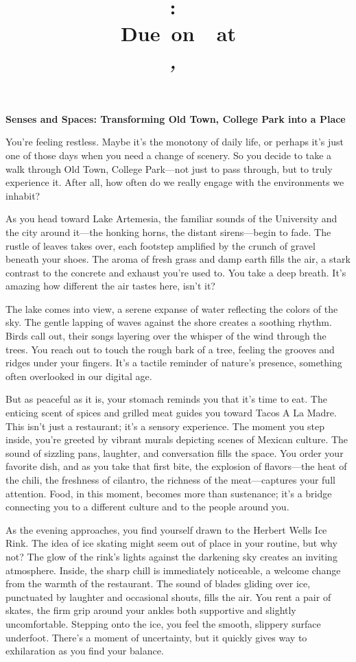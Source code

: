 \documentclass[12pt]{article}
\title{
	\vspace{2in}
	\textmd{\textbf{\hmwkClass:\ \hmwkTitle}}\\
	\normalsize\vspace{0.1in}\small{Due\ on\ \hmwkDueDate\ at \hmwkDueTime}\\
	\vspace{0.1in}\large{\textit{\hmwkClassInstructor,\ \hmwkClassTime}}
	\vspace{3in}
}
\author{\textbf{\hmwkAuthorName}}
\date{\hmwkCompletionDate}
\begin{document}
\maketitle

\pagebreak

\doublespacing

\textbf{Senses and Spaces: Transforming Old Town, College Park into a Place}

You're feeling restless. Maybe it's the monotony of daily life, or perhaps it's just one of those days when you need a change of scenery. So you decide to take a walk through Old Town, College Park—not just to pass through, but to truly experience it. After all, how often do we really engage with the environments we inhabit?

As you head toward Lake Artemesia, the familiar sounds of the University and the city around it—the honking horns, the distant sirens—begin to fade. The rustle of leaves takes over, each footstep amplified by the crunch of gravel beneath your shoes. The aroma of fresh grass and damp earth fills the air, a stark contrast to the concrete and exhaust you're used to. You take a deep breath. It's amazing how different the air tastes here, isn't it?

The lake comes into view, a serene expanse of water reflecting the colors of the sky. The gentle lapping of waves against the shore creates a soothing rhythm. Birds call out, their songs layering over the whisper of the wind through the trees. You reach out to touch the rough bark of a tree, feeling the grooves and ridges under your fingers. It's a tactile reminder of nature's presence, something often overlooked in our digital age.

But as peaceful as it is, your stomach reminds you that it's time to eat. The enticing scent of spices and grilled meat guides you toward Tacos A La Madre. This isn't just a restaurant; it's a sensory experience. The moment you step inside, you're greeted by vibrant murals depicting scenes of Mexican culture. The sound of sizzling pans, laughter, and conversation fills the space. You order your favorite dish, and as you take that first bite, the explosion of flavors—the heat of the chili, the freshness of cilantro, the richness of the meat—captures your full attention. Food, in this moment, becomes more than sustenance; it's a bridge connecting you to a different culture and to the people around you.

As the evening approaches, you find yourself drawn to the Herbert Wells Ice Rink. The idea of ice skating might seem out of place in your routine, but why not? The glow of the rink's lights against the darkening sky creates an inviting atmosphere. Inside, the sharp chill is immediately noticeable, a welcome change from the warmth of the restaurant. The sound of blades gliding over ice, punctuated by laughter and occasional shouts, fills the air. You rent a pair of skates, the firm grip around your ankles both supportive and slightly uncomfortable. Stepping onto the ice, you feel the smooth, slippery surface underfoot. There's a moment of uncertainty, but it quickly gives way to exhilaration as you find your balance.
\end{document}
